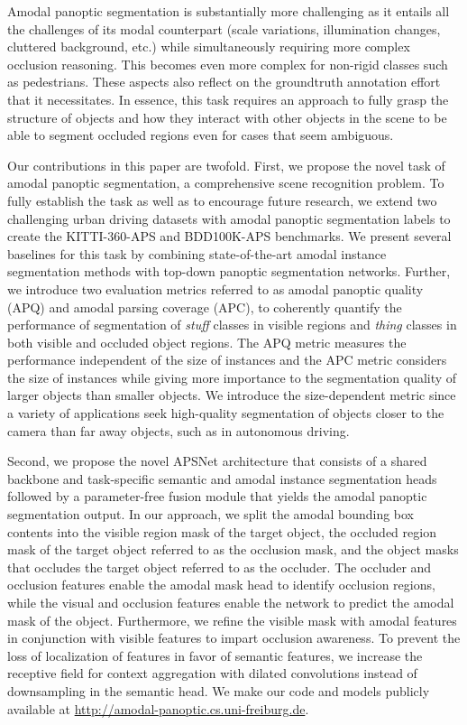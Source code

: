 \documentclass[10pt,twocolumn,letterpaper]{article}
\begin{document}
Amodal panoptic segmentation is substantially more challenging as it entails all the challenges of its modal counterpart (scale variations, illumination changes, cluttered background, etc.) while simultaneously requiring more complex occlusion reasoning. This becomes even more complex for non-rigid classes such as pedestrians. These aspects also reflect on the groundtruth annotation effort that it necessitates. In essence, this task requires an approach to fully grasp the structure of objects and how they interact with other objects in the scene to be able to segment occluded regions even for cases that seem ambiguous.

Our contributions in this paper are twofold. First, we propose the novel task of amodal panoptic segmentation, a comprehensive scene recognition problem. To fully establish the task as well as to encourage future research, we extend two challenging urban driving datasets with amodal panoptic segmentation labels to create the KITTI-360-APS and BDD100K-APS benchmarks. We present several baselines for this task by combining state-of-the-art amodal instance segmentation methods with top-down panoptic segmentation networks. Further, we introduce two evaluation metrics referred to as amodal panoptic quality (APQ) and amodal parsing coverage (APC), to coherently quantify the performance of segmentation of \textit{stuff} classes in visible regions and \textit{thing} classes in both visible and occluded object regions. The APQ metric measures the performance independent of the size of instances and the APC metric considers the size of instances while giving more importance to the segmentation quality of larger objects than smaller objects. We introduce the size-dependent metric since a variety of applications seek high-quality segmentation of objects closer to the camera than far away objects, such as in autonomous driving.

Second, we propose the novel \mbox{APSNet} architecture that consists of a shared backbone and task-specific semantic and amodal instance segmentation heads followed by a parameter-free fusion module that yields the amodal panoptic segmentation output. In our approach, we split the amodal bounding box contents into the visible region mask of the target object, the occluded region mask of the target object referred to as the occlusion mask, and the object masks that occludes the target object referred to as the occluder. The occluder and occlusion features enable the amodal mask head to identify occlusion regions, while the visual and occlusion features enable the network to predict the amodal mask of the object. Furthermore, we refine the visible mask with amodal features in conjunction with visible features to impart occlusion awareness. To prevent the loss of localization of features in favor of semantic features, we increase the receptive field for context aggregation with dilated convolutions instead of downsampling in the semantic head. We make our code and models publicly available at \url{http://amodal-panoptic.cs.uni-freiburg.de}.
\end{document}
